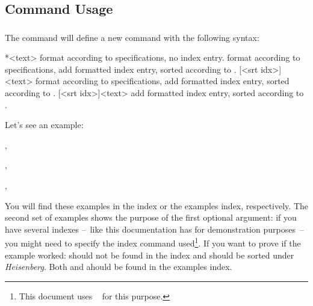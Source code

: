 \documentclass{cnpkgdoc}
\begin{document}
\subsection{Command Usage}\label{ssec:command:usage}
\subsubsection{}\label{ssec:command:usage:newidxcmd}
The command  will define a new
command  with the following syntax:
\begin{beschreibung}
 *{<text>}\newline
   format  according to specifications, no index entry.
 \newline
   format  according to specifications, add formatted index entry,
   sorted according to .
 [<srt idx>]{<text>}\newline
   format  according to specifications, add formatted index entry,
   sorted according to .
 [<srt idx>]{<text>}\newline
   add formatted index entry, sorted according to .
\end{beschreibung}

Let's see an example:
\begin{beispiel}
 , 
 
 , 

 , 
\end{beispiel}
You will find these examples in the index or the examples index, respectively.
The second set of examples shows the purpose of the first optional argument: if
you have several indexes --~like this documentation has for demonstration
purposes~-- you might need to specify the index command used\footnote{This
document uses ~\cite{pkg:imakeidx} for this purpose.}. If you
want to prove if the example worked:  should not be
found in the index and  should be sorted under
\emph{Heisenberg}. Both  and  ahould be
found in the examples index.
\end{document}
